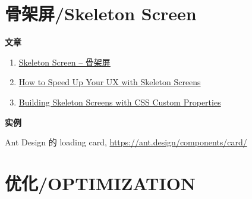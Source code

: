 \section{骨架屏/Skeleton
Screen}\label{ux9aa8ux67b6ux5c4fskeleton-screen}

\textbf{文章}

\begin{enumerate}
\def\labelenumi{\arabic{enumi}.}
\tightlist
\item
  \href{http://www.bestvist.com/2018/01/19/skeleton-screen/}{Skeleton
  Screen -- 骨架屏}
\item
  \href{https://www.sitepoint.com/how-to-speed-up-your-ux-with-skeleton-screens/}{How
  to Speed Up Your UX with Skeleton Screens}
\item
  \href{https://css-tricks.com/building-skeleton-screens-css-custom-properties/}{Building
  Skeleton Screens with CSS Custom Properties}
\end{enumerate}

\textbf{实例}

Ant Design 的 loading card, \url{https://ant.design/components/card/}

\section{优化/OPTIMIZATION}\label{ux4f18ux5316optimization}
